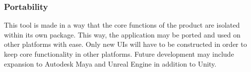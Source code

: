 \subsubsection{Portability}
This tool is made in a way that the core functions of the product are isolated within its own package. This way, the application may be ported and used on other platforms with ease. Only new UIs will have to be constructed in order to keep core functionality in other platforms. Future development may include expansion to Autodesk Maya and Unreal Engine in addition to Unity.
